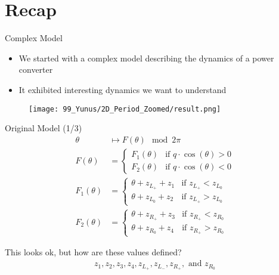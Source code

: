\section{Recap}

\begin{frame}{Complex Model}
    \begin{itemize}
        \item We started with a complex model describing the dynamics of a power converter
        \item It exhibited interesting dynamics we want to understand
    \end{itemize}
    \begin{figure}
        \texttt{[image: 99\_Yunus/2D\_Period\_Zoomed/result.png]}
    \end{figure}

\end{frame}

\begin{frame}{Original Model (1/3)}
    \vspace{-2.0em}
    \begin{align}
        \theta      & \mapsto  F(\theta) \mod 2 \pi
        \\
        F(\theta)   & = \begin{cases}
                            F_1(\theta) & \text{if } q \cdot \cos(\theta) > 0 \\
                            F_2(\theta) & \text{if } q \cdot \cos(\theta) < 0
                        \end{cases}
        \\
        F_1(\theta) & = \begin{cases}
                            \theta + z_{L_+} + z_1 & \text{if } z_{L_+} < z_{L_0} \\
                            \theta + z_{L_0} + z_2 & \text{if } z_{L_+} > z_{L_0}
                        \end{cases}
        \\
        F_2(\theta) & = \begin{cases}
                            \theta + z_{R_+} + z_3 & \text{if } z_{R_+} < z_{R_0} \\
                            \theta + z_{R_0} + z_4 & \text{if } z_{R_+} > z_{R_0}
                        \end{cases}
    \end{align}

    \pause
    \vspace{2em}
    This looks ok, but how are these values defined?
    \begin{align*}
        z_1, z_2, z_3, z_4, z_{L_+}, z_{L_-}, z_{R_+}, \text{ and } z_{R_0}
    \end{align*}
\end{frame}

